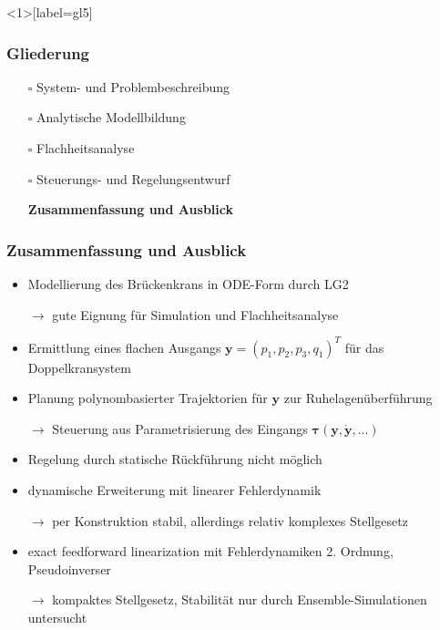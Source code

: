 \documentclass[
	ngerman,
	10pt,				%
	aspectratio=169, 	%
	xcolor=dvipsnames
]{beamer}
\newcommand{\cdbox}{$\square$\hspace{-0.65em}\raisebox{0.1em}{\checkmark}\hspace{-0.18em}}
\begin{document}

\begin{frame}<1>[label=gl5]
	\frametitle{Gliederung}
	\begin{itemize}
		\item[\cdbox] System- und Problembeschreibung
		\item[\cdbox] Analytische Modellbildung
		\item[\cdbox] Flachheitsanalyse
		\item[\cdbox] Steuerungs- und Regelungsentwurf
		\item[\only<1>{$\rightarrow$}\only<2>{$\rightarrow$}\only<4->{\cdbox}]
		\textbf<1>{Zusammenfassung und Ausblick}
	\end{itemize}
\end{frame}


\begin{frame}[label=Zusammenfassung1]
	\frametitle{Zusammenfassung {und Ausblick}}
	\begin{itemize}
		\item Modellierung des Brückenkrans in ODE-Form durch LG2
		\item[$\rightarrow$] gute Eignung für Simulation und Flachheitsanalyse
		\bigskip
		\pause
		\item Ermittlung eines flachen Ausgangs $\mathbf{y} = (p_1, p_2, p_3, q_1)^T$ für das Doppelkransystem
		\pause
		\item Planung polynombasierter Trajektorien für $\mathbf{y}$ zur Ruhelagenüberführung
		\item[$\rightarrow$] Steuerung aus Parametrisierung des Eingangs $\boldsymbol{\tau}(\mathbf{y}, \dot{\mathbf{y}}, ...)$
		\bigskip
		\pause
		\item Regelung durch statische Rückführung nicht möglich
		\pause
		\item dynamische Erweiterung mit linearer Fehlerdynamik
		\item[$\rightarrow$] per Konstruktion stabil, allerdings relativ komplexes Stellgesetz
		\pause
		\item exact feedforward linearization mit Fehlerdynamiken 2. Ordnung, Pseudoinverser
		\item[$\rightarrow$] kompaktes Stellgesetz, Stabilität nur durch Ensemble-Simulationen untersucht
	\end{itemize}
	
\end{frame}
\end{document}
